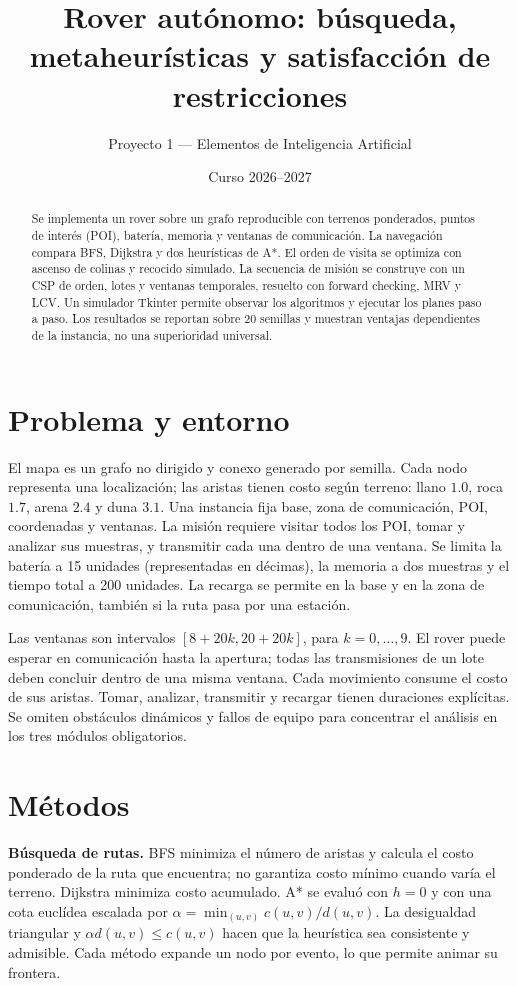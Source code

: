 \documentclass[10pt,spanish]{article}
\title{Rover autónomo: búsqueda, metaheurísticas y satisfacción de restricciones}
\author{Proyecto 1 --- Elementos de Inteligencia Artificial}
\date{Curso 2026--2027}
\begin{document}
\maketitle
\begin{abstract}
Se implementa un rover sobre un grafo reproducible con terrenos ponderados, puntos de interés (POI), batería, memoria y ventanas de comunicación. La navegación compara BFS, Dijkstra y dos heurísticas de A*. El orden de visita se optimiza con ascenso de colinas y recocido simulado. La secuencia de misión se construye con un CSP de orden, lotes y ventanas temporales, resuelto con forward checking, MRV y LCV. Un simulador Tkinter permite observar los algoritmos y ejecutar los planes paso a paso. Los resultados se reportan sobre 20 semillas y muestran ventajas dependientes de la instancia, no una superioridad universal.
\end{abstract}

\section{Problema y entorno}
El mapa es un grafo no dirigido y conexo generado por semilla. Cada nodo representa una localización; las aristas tienen costo según terreno: llano $1.0$, roca $1.7$, arena $2.4$ y duna $3.1$. Una instancia fija base, zona de comunicación, POI, coordenadas y ventanas. La misión requiere visitar todos los POI, tomar y analizar sus muestras, y transmitir cada una dentro de una ventana. Se limita la batería a 15 unidades (representadas en décimas), la memoria a dos muestras y el tiempo total a 200 unidades. La recarga se permite en la base y en la zona de comunicación, también si la ruta pasa por una estación.

Las ventanas son intervalos $[8+20k,20+20k]$, para $k=0,\ldots,9$. El rover puede esperar en comunicación hasta la apertura; todas las transmisiones de un lote deben concluir dentro de una misma ventana. Cada movimiento consume el costo de sus aristas. Tomar, analizar, transmitir y recargar tienen duraciones explícitas. Se omiten obstáculos dinámicos y fallos de equipo para concentrar el análisis en los tres módulos obligatorios.

\section{Métodos}
\textbf{Búsqueda de rutas.} BFS minimiza el número de aristas y calcula el costo ponderado de la ruta que encuentra; no garantiza costo mínimo cuando varía el terreno. Dijkstra minimiza costo acumulado. A* se evaluó con $h=0$ y con una cota euclídea escalada por $\alpha=\min_{(u,v)} c(u,v)/d(u,v)$. La desigualdad triangular y $\alpha d(u,v)\leq c(u,v)$ hacen que la heurística sea consistente y admisible. Cada método expande un nodo por evento, lo que permite animar su frontera.
\end{document}
